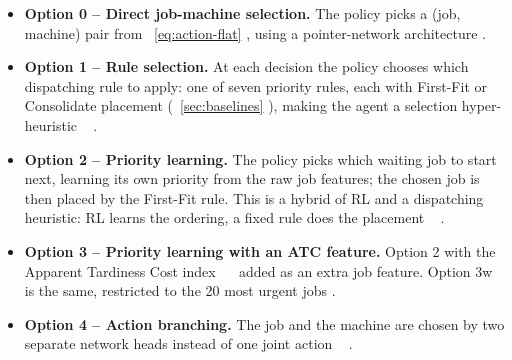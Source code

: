 \documentclass[12pt]{article}
\providecommand{\DIFaddtex}[1]{{\color{red}#1}} %
\providecommand{\DIFdeltex}[1]{} %
\providecommand{\DIFaddbegin}{} %
\providecommand{\DIFaddend}{} %
\providecommand{\DIFdelbegin}{} %
\providecommand{\DIFdelend}{} %
\providecommand{\DIFadd}[1]{\texorpdfstring{\DIFaddtex{#1}}{#1}} %
\providecommand{\DIFdel}[1]{\texorpdfstring{\DIFdeltex{#1}}{}} %
\providecommand{\DIFscaledelfig}{0.5}
\newlength{\DIFdelgraphicswidth} %
\newlength{\DIFdelgraphicsheight} %
\providecommand{\DIFaddincludegraphics}[2][]{{\color{blue}\fbox{\DIFOincludegraphics[#1]{#2}}}} %
\providecommand{\DIFdelincludegraphics}[2][]{%
\sbox{\DIFdelgraphicsbox}{\DIFOincludegraphics[#1]{#2}}%
\settoboxwidth{\DIFdelgraphicswidth}{\DIFdelgraphicsbox} %
\settoboxtotalheight{\DIFdelgraphicsheight}{\DIFdelgraphicsbox} %
\scalebox{\DIFscaledelfig}{%
\parbox[b]{\DIFdelgraphicswidth}{\usebox{\DIFdelgraphicsbox}\\[-\baselineskip] \rule{\DIFdelgraphicswidth}{0em}}\llap{\resizebox{\DIFdelgraphicswidth}{\DIFdelgraphicsheight}{%
\setlength{\unitlength}{\DIFdelgraphicswidth}%
\begin{picture}(1,1)%
\thicklines\linethickness{2pt} %
{\color[rgb]{1,0,0}\put(0,0){\framebox(1,1){}}}%
{\color[rgb]{1,0,0}\put(0,0){\line( 1,1){1}}}%
{\color[rgb]{1,0,0}\put(0,1){\line(1,-1){1}}}%
\end{picture}%
}\hspace*{3pt}}} %
} %
\DeclareRobustCommand{\DIFaddbegin}{\DIFOaddbegin \let\includegraphics\DIFaddincludegraphics} %
\DeclareRobustCommand{\DIFaddend}{\DIFOaddend \let\includegraphics\DIFOincludegraphics} %
\DeclareRobustCommand{\DIFdelbegin}{\DIFOdelbegin \let\includegraphics\DIFdelincludegraphics} %
\DeclareRobustCommand{\DIFdelend}{\DIFOaddend \let\includegraphics\DIFOincludegraphics} %
\begin{document}
\begin{itemize}
    \item \textbf{Option 0 -- Direct \DIFdelbegin \DIFdel{Job-Machine Selection:}\DIFdelend \DIFaddbegin \DIFadd{job-machine selection.}\DIFaddend } The policy picks a (job, machine) pair \DIFdelbegin \DIFdel{with a flat network or }\DIFdelend \DIFaddbegin \DIFadd{from \mbox{%
\cref{eq:action-flat}}\hskip0pt%
, using a }\DIFaddend pointer-network architecture \cite{vinyals2015pointernet, kool2019attention}.
    \DIFdelbegin \DIFdel{A large discrete action space is a known struggle with policy-gradient methods.
    }\DIFdelend \item \textbf{Option 1 -- \DIFdelbegin \DIFdel{Hyper-heuristic }\DIFdelend Rule \DIFdelbegin \DIFdel{Selection:}\DIFdelend \DIFaddbegin \DIFadd{selection.}\DIFaddend } \DIFdelbegin \DIFdel{The }\DIFdelend \DIFaddbegin \DIFadd{At each decision the }\DIFaddend policy chooses which dispatching rule to apply\DIFdelbegin \DIFdel{at each decision \mbox{%
\cite{burke2013hyperheuristicsurvey, lassoued2026hyperheuristic}}\hskip0pt%
}\DIFdelend \DIFaddbegin \DIFadd{: one of seven priority rules, each with First-Fit or Consolidate placement (\mbox{%
\cref{sec:baselines}}\hskip0pt%
), making the agent a selection hyper-heuristic \mbox{%
\cite{burke2013hyperheuristicsurvey, lassoued2026hyperheuristic}}\hskip0pt%
.
    }\DIFaddend \item \textbf{Option 2 -- Priority \DIFdelbegin \DIFdel{Learning:}\DIFdelend \DIFaddbegin \DIFadd{learning.}\DIFaddend } The policy \DIFdelbegin \DIFdel{scores jobs directly with either learned or directly engineered features, }\DIFdelend \DIFaddbegin \DIFadd{picks which waiting job to start next, learning its own priority from the raw job features; the chosen job is then placed by the First-Fit rule. This is }\DIFaddend a hybrid of RL \DIFaddbegin \DIFadd{and a dispatching heuristic: RL learns the ordering, a fixed rule does the placement \mbox{%
\cite{mao2016deeprm, min2022atctuning}}\hskip0pt%
}\DIFaddend .
    \item \textbf{Option 3 -- \DIFdelbegin \DIFdel{Windowed }\DIFdelend Priority \DIFdelbegin \DIFdel{:}\DIFdelend \DIFaddbegin \DIFadd{learning with an ATC feature.}\DIFaddend } Option 2 \DIFdelbegin \DIFdel{, but masked to only }\DIFdelend \DIFaddbegin \DIFadd{with the Apparent Tardiness Cost index \mbox{%
\cite{vepsalainen1987atc} }\hskip0pt%
added as an extra job feature. Option 3w is the same, restricted to }\DIFaddend the 20 most urgent jobs \cite{mao2016deeprm}\DIFaddbegin \DIFadd{.
    }\DIFaddend \item \textbf{Option 4 -- Action \DIFdelbegin \DIFdel{Branching:}\DIFdelend \DIFaddbegin \DIFadd{branching.}\DIFaddend } \DIFdelbegin \DIFdel{Job and }\DIFdelend \DIFaddbegin \DIFadd{The job and the }\DIFaddend machine are chosen by two separate \DIFaddbegin \DIFadd{network }\DIFaddend heads instead of \DIFdelbegin \DIFdel{together (flat) \mbox{%
\cite{tavakoli2018actionbranching}}\hskip0pt%
}\DIFdelend \DIFaddbegin \DIFadd{one joint action \mbox{%
\cite{tavakoli2018actionbranching}}\hskip0pt%
.
}\DIFaddend \end{itemize}
\end{document}
